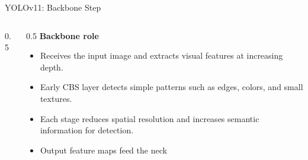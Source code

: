 \begin{frame}{YOLOv11: Backbone Step}
\begin{columns}[c]
\begin{column}{0.5\textwidth}
    \end{column}
    \begin{column}{0.5\textwidth}
      \textbf{Backbone role}
      \begin{itemize}
        \item Receives the input image and extracts visual features at increasing depth.
        \item Early CBS layer detects simple patterns such as edges, colors, and small textures.
        \item Each stage reduces spatial resolution and increases semantic information for detection.
        \item Output feature maps feed the neck
      \end{itemize}
    \end{column}
  \end{columns}
\end{frame}

